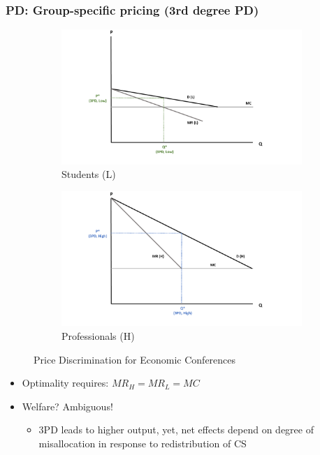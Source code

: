 \documentclass[10pt]{beamer}
\begin{document}
\begin{frame} 
	\frametitle{PD: Group-specific pricing (3rd degree PD)}


\begin{figure}[H]
	\centering
	\begin{subfigure}[]{0.49\textwidth}
		\centering
		\includegraphics[width=\linewidth]{3pd_low.pdf} 
		\caption{Students (L)} \label{fig:stud}
	\end{subfigure}
	\hfill
	\begin{subfigure}[]{0.49\textwidth}
		\centering
		\includegraphics[width=\linewidth]{3pd_high.pdf} 
		\caption{Professionals (H)} \label{fig:prof}
	\end{subfigure}
	\caption{Price Discrimination for Economic Conferences}
\end{figure}



\begin{itemize}
	\item Optimality requires: $MR_{H}=MR_{L}=MC$
	\item Welfare? Ambiguous! 
		\begin{itemize}
			\item 3PD leads to higher output, yet, net effects depend on degree of misallocation in response to redistribution of CS
		\end{itemize}
\end{itemize}


\end{frame}
\end{document}
